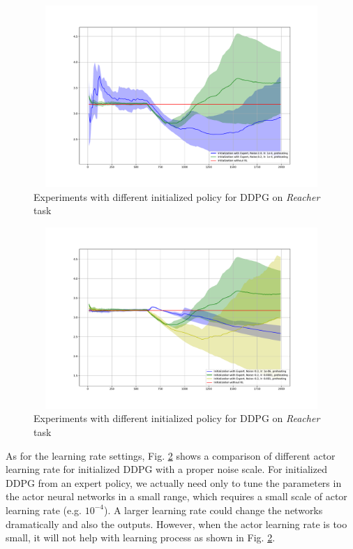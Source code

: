 \documentclass{article}
\begin{document}
\begin{figure}[htbp]
	\centering
	\includegraphics[height=260, width=450]{img/ddpg_compare4.pdf}
	\caption{Experiments with different initialized policy for DDPG on \textit{Reacher} task}
	\label{fig:noise4}
\end{figure}

\begin{figure}[htbp]
	\centering
	\includegraphics[height=260, width=450]{img/ddpg_compare5.pdf}
	\caption{Experiments with different initialized policy for DDPG on \textit{Reacher} task}
	\label{fig:noise5}
\end{figure}

As for the learning rate settings, Fig. \ref{fig:noise5} shows a comparison of different actor learning rate for initialized DDPG with a proper noise scale. For initialized DDPG from an expert policy, we actually need only to tune the parameters in the actor neural networks in a small range, which requires a small scale of actor learning rate (e.g. $10^{-4}$). A larger learning rate could change the networks dramatically and also the outputs. However, when the actor learning rate is too small, it will not help with learning process as shown in Fig. \ref{fig:noise5}.
\end{document}
